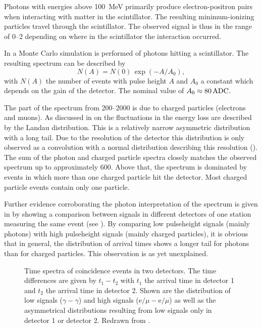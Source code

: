 Photons with energies above \SI{100}{\mega\electronvolt} primarily produce
electron-positron pairs when interacting with matter in the scintillator.  The
resulting minimum-ionizing particles travel through the scintillator.  The
observed signal is thus in the range of \SIrange{0}{2}{\mip} depending on where
in the scintillator the interaction occurred.

In \cite{Pennink:2010} a Monte Carlo simulation is performed of photons hitting
a \hisparc scintillator.  The resulting spectrum can be described by
\begin{equation}
N(A) = N(0) \, \exp(-A / A_0),
\end{equation}
with $N(A)$ the number of events with pulse height $A$ and $A_0$ a constant
which depends on the gain of the detector.  The nominal value of $A_0
\approx \SI{80}{\adc}$.

The part of the spectrum from \SIrange{200}{2000}{\adc} is due to charged
particles (electrons and muons).  As discussed in  on
 the fluctuations in the energy loss are described by the
Landau distribution.  This is a relatively narrow asymmetric distribution with a
long tail.  Due to the resolution of the detector this distribution is only
observed as a convolution with a normal distribution describing this resolution
().  The sum of the photon and charged particle
spectra closely matches the observed spectrum up to approximately
\SI{600}{\adc}.  Above that, the spectrum is dominated by events in which more
than one charged particle hit the detector. Most charged particle events contain
only one particle.

Further evidence corroborating the photon interpretation of the spectrum is
given in \cite{Pennink:2010} by showing a comparison between signals in
different detectors of one station measuring the same event (see
). By comparing low pulseheight signals (mainly
photons) with high pulseheight signals (mainly charged particles), it is
obvious that in general, the distribution of arrival times shows a
longer tail for photons than for charged particles. This observation is as
yet unexplained.
\begin{figure}
\centering
{

}
\caption{Time spectra of coincidence events in two detectors.  The time
differences are given by $t_1 - t_2$ with $t_1$ the arrival time in
detector 1 and $t_2$ the arrival time in detector 2.  Shown are the
distribution of low signals ($\gamma - \gamma$) and high signals
($\mathrm{e}/\mu - \mathrm{e}/\mu$) as well as the asymmetrical
distributions resulting from low signals only in detector 1 or detector 2.
Redrawn from \cite{Pennink:2010}.}
\label{fig:photon-time}
\end{figure}


